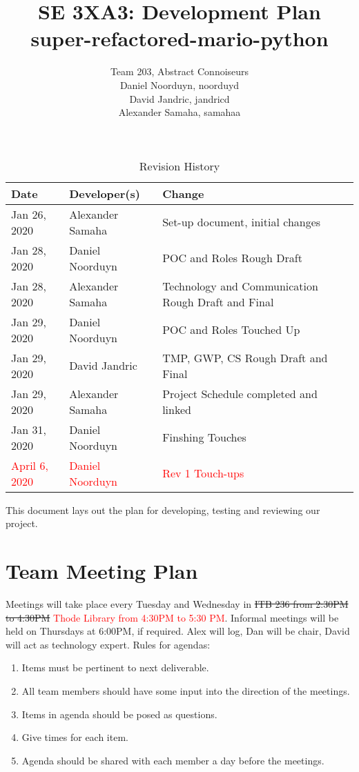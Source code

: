 \documentclass{article}
\title{SE 3XA3: Development Plan\\super-refactored-mario-python}
\author{Team 203, Abstract Connoiseurs\\
Daniel Noorduyn, noorduyd\\
David Jandric, jandricd\\
Alexander Samaha, samahaa\\
}
\date{}
\begin{document}
\begin{table}[hp]
\caption{Revision History} \label{TblRevisionHistory}
\begin{tabularx}{\textwidth}{llX}
\toprule
\textbf{Date} & \textbf{Developer(s)} & \textbf{Change}\\
\midrule
Jan 26, 2020 & Alexander Samaha & Set-up document, initial changes\\
Jan 28, 2020 & Daniel Noorduyn & POC and Roles Rough Draft\\
Jan 28, 2020 & Alexander Samaha & Technology and Communication Rough Draft and Final\\
Jan 29, 2020 & Daniel Noorduyn & POC and Roles Touched Up\\
Jan 29, 2020 & David Jandric & TMP, GWP, CS Rough Draft and Final\\
Jan 29, 2020 & Alexander Samaha & Project Schedule completed and linked\\
Jan 31, 2020 & Daniel Noorduyn & Finshing Touches\\
\textcolor{red}{April 6, 2020} & \textcolor{red}{Daniel Noorduyn} & \textcolor{red}{Rev 1 Touch-ups}\\
\bottomrule
\end{tabularx}
\end{table}

\newpage

\maketitle

This document lays out the plan for developing, testing and reviewing our
project.

\section{Team Meeting Plan}

Meetings will take place every Tuesday and Wednesday in \sout{ITB 236 from
2:30PM to 4:30PM} \textcolor{red}{Thode Library from 4:30PM to 5:30 PM}.
Informal meetings will be held on Thursdays at 6:00PM, if required. Alex will
log, Dan will be chair, David will act as technology expert.
Rules for agendas:
\begin{enumerate}
    \item Items must be pertinent to next deliverable.
    \item All team members should have some input into the direction of the meetings.
    \item Items in agenda should be posed as questions.
    \item Give times for each item.
    \item Agenda should be shared with each member a day before the meetings.
\end{enumerate}
\end{document}
